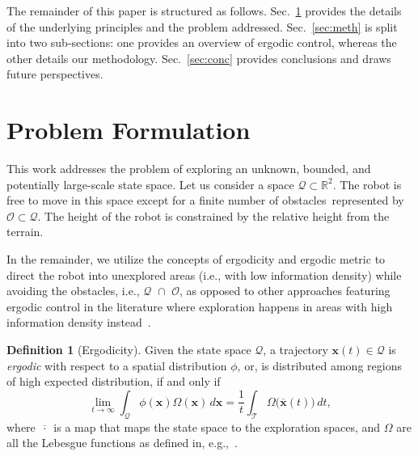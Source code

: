 \documentclass[letterpaper, 10 pt, conference, twoside]{IEEEtran}
\theoremstyle{definition}
\newtheorem{defn}{Definition}[section]
\begin{document}
The remainder of this paper is structured as follows. Sec.~\ref{sec:pb} provides the details of the underlying principles and the problem addressed. Sec.~\ref{sec:meth} is split into two sub-sections: one provides an overview of ergodic control, whereas the other details our methodology. Sec.~\ref{sec:conc} provides conclusions and draws future perspectives.


\section{Problem Formulation}\label{sec:pb}
\noindent
This work addresses the problem of exploring an unknown, bounded, and potentially large-scale state space. %
%
Let us consider a %
space $\mathcal{Q}\subset\mathbb{R}^2$. The robot is free to move in this space except for a finite number of obstacles~represented by $\mathcal{O}\subset\mathcal{Q}$. The height of the robot is constrained by the relative height from the terrain. 

In the remainder, we utilize the concepts of ergodicity and ergodic metric to direct the robot into unexplored areas (i.e., with low information density) while avoiding the obstacles, i.e., $\mathcal{Q}\,\,\cap\,\,\mathcal{O}$, as opposed to other approaches featuring ergodic control in the literature where exploration happens in areas with high information density instead~\cite{mathew2011metrics,abraham2017ergodic,miller2013trajectory}.

\begin{defn}[Ergodicity]
  Given the %
  state space $\mathcal{Q}$, a trajectory $\mathbf{x}(t)\in\mathcal{Q}$ is \textit{ergodic} with respect to a spatial distribution $\phi$, or, %
  is distributed among regions of high expected distribution, if and only if
  \begin{equation}
    \lim_{t\rightarrow\infty}{\int_{\mathcal{Q}}\phi(\mathbf{x})\Omega(\mathbf{x})\,d\mathbf{x}=\frac{1}{t}\int_{\mathcal{T}}{{\Omega\big(\overline{\mathbf{x}}(t)\big)}}\,dt},
  \end{equation}
  where $\overline{\,\cdot\,}$ is a map that maps the state space to the exploration spaces, and $\Omega$ are all the Lebesgue functions as defined in, e.g.,~\cite{mathew2011metrics}.
\end{defn}
\end{document}
